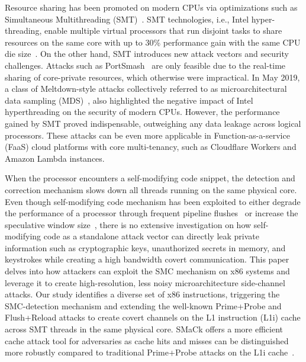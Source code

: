 Resource sharing has been promoted on modern CPUs via optimizations such as Simultaneous Multithreading (SMT)~\cite{tullsen1995simultaneous}.
SMT technologies, i.e., Intel hyper-threading, enable multiple virtual processors that run disjoint tasks to share resources on the same core with up to 30\% performance gain with the same CPU die size~\cite{intelHTPerf}.
On the other hand, SMT introduces new attack vectors and security challenges.
Attacks such as PortSmash~\cite{aldaya2019port} are only feasible due to the real-time sharing of core-private resources, which otherwise were impractical. 
In May 2019, a class of Meltdown-style attacks collectively referred to as microarchitectural data sampling (MDS)~\cite{schwarz2019zombieload,van2019ridl}, 
also highlighted the negative impact of Intel hyperthreading on the security of modern CPUs.
However, the performance gained by SMT proved indispensable, outweighing any data leakage across logical processors.
These attacks can be even more applicable in Function-as-a-service (FaaS) cloud platforms with core multi-tenancy, such as Cloudflare Workers and Amazon Lambda instances.

When the processor encounters a self-modifying code snippet, the detection and correction mechanism slows down all threads running on the same physical core. Even though self-modifying code mechanism has been exploited to either degrade the performance of a processor through frequent pipeline 
flushes~\cite{aldaya2022hyperdegrade} or increase the speculative window size~\cite{ragab2021rage}, there is no extensive investigation on how self-modifying code as a standalone attack vector can directly leak private information such as cryptographic keys, unauthorized secrets in memory, and keystrokes while creating a high bandwidth covert communication. 
This paper delves into how attackers can exploit the SMC mechanism on x86 systems and leverage it to create high-resolution, less noisy microarchitecture side-channel attacks. 
Our study identifies a diverse set of x86 instructions, triggering the SMC-detection mechanism and extending the well-known Prime+Probe and Flush+Reload attacks to create covert channels on the L1 instruction (L1i) cache across SMT threads in the same physical core. SMaCk offers a more efficient cache attack tool for adversaries as cache hits and misses can be distinguished more robustly compared to traditional Prime+Probe attacks on the L1i cache~\cite{aciiccmez2007yet,aciiccmez2010new}. 

